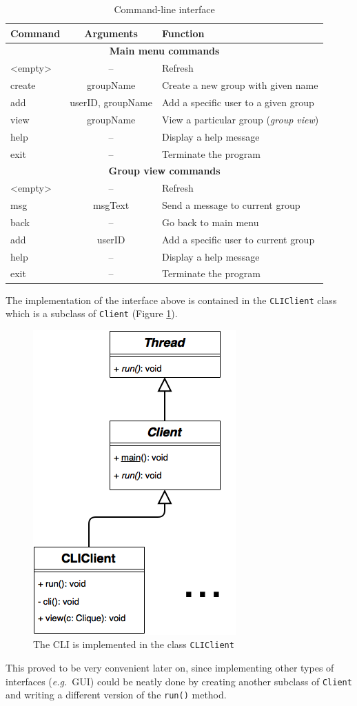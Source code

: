 \documentclass[a4paper, twoside, 12pt]{report}
\begin{document}
\begin{table}[H]
\centering
\begin{tabular*}{0.9\textwidth}{l | c | l}
    Command & Arguments & Function \\
    \hline
    \multicolumn{3}{c}{\textbf{Main menu commands}} \\
    \hline
    <empty> & -- & Refresh \\
    create & groupName & Create a new group with given name \\
    add & userID, groupName & Add a specific user to a given group \\
    view & groupName & View a particular group (\emph{group view}) \\
    help & -- & Display a help message \\
    exit & -- & Terminate the program \\
    \hline
    \multicolumn{3}{c}{\textbf{Group view commands}} \\
    \hline 
    <empty> & -- & Refresh \\
    msg & msgText & Send a message to current group \\
    back & -- & Go back to main menu \\
    add & userID & Add a specific user to current group \\
    help & -- & Display a help message \\
    exit & -- & Terminate the program \\ 
\end{tabular*}
\caption{\label{tab:CLI} Command-line interface}
\end{table}
\restoregeometry
The implementation of the interface above is contained in the \texttt{CLIClient} class which is a subclass of \texttt{Client} (Figure \ref{fig:CLIClient_uml}).
\begin{figure}[H]
\centering
\includegraphics[width = 0.31 \linewidth]{pics/CLIClient_uml.png}
\caption{\label{fig:CLIClient_uml} The CLI is implemented in the class \texttt{CLIClient}}
\end{figure}
This proved to be very convenient later on, since implementing other types of interfaces (\textit{e.g.}~GUI) could be neatly done by creating another subclass of \texttt{Client} and writing a different version of the \texttt{run()} method.
\end{document}
